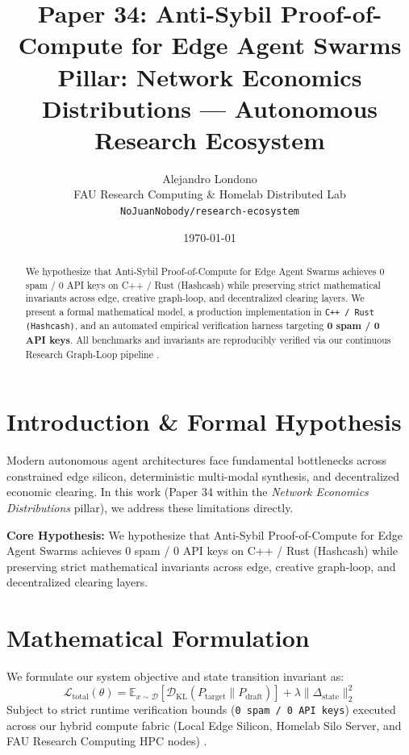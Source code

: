 \documentclass[10pt,twocolumn]{article}
\title{\textbf{Paper 34: Anti-Sybil Proof-of-Compute for Edge Agent Swarms}\\
\large Pillar: Network Economics Distributions --- Autonomous Research Ecosystem}
\author{
  Alejandro Londono \\
  FAU Research Computing \& Homelab Distributed Lab \\
  \texttt{NoJuanNobody/research-ecosystem}
}
\date{\today}
\begin{document}
\maketitle

\begin{abstract}
We hypothesize that Anti-Sybil Proof-of-Compute for Edge Agent Swarms achieves 0 spam / 0 API keys on C++ / Rust (Hashcash) while preserving strict mathematical invariants across edge, creative graph-loop, and decentralized clearing layers.
We present a formal mathematical model, a production implementation in \texttt{C++ / Rust (Hashcash)}, and an automated empirical verification harness targeting \textbf{0 spam / 0 API keys}. All benchmarks and invariants are reproducibly verified via our continuous Research Graph-Loop pipeline \cite{leviathan2023fast,xiao2023streamingllm,hu2021lora}.
\end{abstract}

\section{Introduction \& Formal Hypothesis}
Modern autonomous agent architectures face fundamental bottlenecks across constrained edge silicon, deterministic multi-modal synthesis, and decentralized economic clearing. In this work (Paper 34 within the \textit{Network Economics Distributions} pillar), we address these limitations directly.

\textbf{Core Hypothesis:} We hypothesize that Anti-Sybil Proof-of-Compute for Edge Agent Swarms achieves 0 spam / 0 API keys on C++ / Rust (Hashcash) while preserving strict mathematical invariants across edge, creative graph-loop, and decentralized clearing layers.

\section{Mathematical Formulation}
We formulate our system objective and state transition invariant as:
\begin{equation}
\mathcal{L}_{\text{total}}(\theta) = \mathbb{E}_{x \sim \mathcal{D}}\left[\mathcal{D}_{\text{KL}}(P_{\text{target}} \parallel P_{\text{draft}})\right] + \lambda \|\Delta_{\text{state}}\|_2^2
\end{equation}
Subject to strict runtime verification bounds (\texttt{0 spam / 0 API keys}) executed across our hybrid compute fabric (Local Edge Silicon, Homelab Silo Server, and FAU Research Computing HPC nodes) \cite{rafailov2023dpo,shapley1953value,hanson2003combinatorial}.
\end{document}
